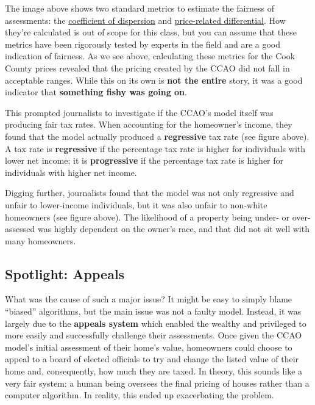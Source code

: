 \documentclass[
  letterpaper,
  DIV=11,
  numbers=noendperiod]{scrreprt}
\begin{document}
The image above shows two standard metrics to estimate the fairness of
assessments: the
\href{https://www.realestateagent.com/real-estate-glossary/real-estate/coefficient-of-dispersion.html}{coefficient
of dispersion} and
\href{https://leg.wa.gov/House/Committees/FIN/Documents/2009/RatioText.pdf}{price-related
differential}. How they're calculated is out of scope for this class,
but you can assume that these metrics have been rigorously tested by
experts in the field and are a good indication of fairness. As we see
above, calculating these metrics for the Cook County prices revealed
that the pricing created by the CCAO did not fall in acceptable ranges.
While this on its own is \textbf{not the entire} story, it was a good
indicator that \textbf{something fishy was going on}.

This prompted journalists to investigate if the CCAO's model itself was
producing fair tax rates. When accounting for the homeowner's income,
they found that the model actually produced a \textbf{regressive} tax
rate (see figure above). A tax rate is \textbf{regressive} if the
percentage tax rate is higher for individuals with lower net income; it
is \textbf{progressive} if the percentage tax rate is higher for
individuals with higher net income.

Digging further, journalists found that the model was not only
regressive and unfair to lower-income individuals, but it was also
unfair to non-white homeowners (see figure above). The likelihood of a
property being under- or over-assessed was highly dependent on the
owner's race, and that did not sit well with many homeowners.

\subsection{Spotlight: Appeals}\label{spotlight-appeals}

What was the cause of such a major issue? It might be easy to simply
blame ``biased'' algorithms, but the main issue was not a faulty model.
Instead, it was largely due to the \textbf{appeals system} which enabled
the wealthy and privileged to more easily and successfully challenge
their assessments. Once given the CCAO model's initial assessment of
their home's value, homeowners could choose to appeal to a board of
elected officials to try and change the listed value of their home and,
consequently, how much they are taxed. In theory, this sounds like a
very fair system: a human being oversees the final pricing of houses
rather than a computer algorithm. In reality, this ended up exacerbating
the problem.
\end{document}
